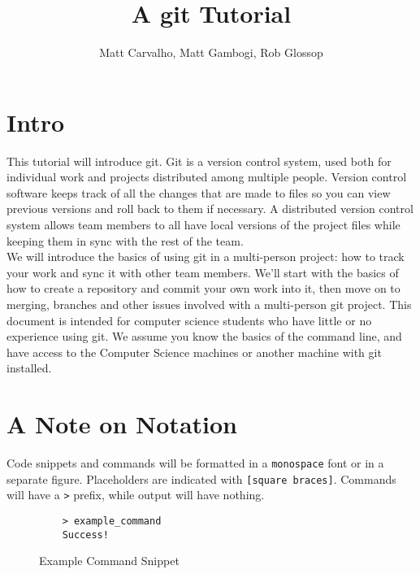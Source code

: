 \documentclass[11pt]{report}
\title{A git Tutorial}
\author{Matt Carvalho, Matt Gambogi, Rob Glossop}
\begin{document}
\thispagestyle{empty}
\maketitle

\clearpage {} 

\tableofcontents

\listoffigures

\clearpage {}
\section{Intro}




This tutorial will introduce git.  Git is a version control system,
used both for individual work and projects distributed among multiple
people.  Version control software keeps track of all the changes that
are made to files so you can view previous versions and roll back to
them if necessary.  A distributed version control system allows team
members to all have local versions of the project files while keeping
them in sync with the rest of the team.\\
\newline
We will introduce the basics of using git in a multi-person project:
how to track your work and sync it with other team members. We'll
start with the basics of how to create a repository and commit your
own work into it, then move on to merging, branches and other issues
involved with a multi-person git project. This document is intended
for computer science students who have little or no experience using
git. We assume you know the basics of the command line, and have
access to the Computer Science machines or another machine with git
installed.

\section{A Note on Notation}
Code snippets and commands will be formatted in a \texttt{monospace} font or in
a separate figure. Placeholders are indicated with \texttt{[square
    braces]}. Commands will have a \texttt{>} prefix, while output
will have nothing.
\begin{figure}[H]
  \caption{Example Command Snippet}
  \begin{lstlisting}
    > example_command
    Success!
  \end{lstlisting}
\end{figure}
\end{document}
